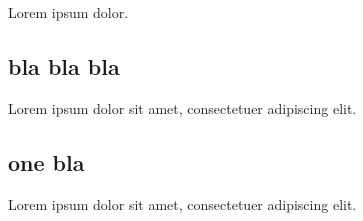 Lorem\cite{Turing1936} ipsum dolor.

\subsection{bla bla bla}
Lorem ipsum dolor sit amet, consectetuer adipiscing elit. 

\subsection{one bla}
Lorem ipsum dolor sit amet, consectetuer adipiscing elit. 
